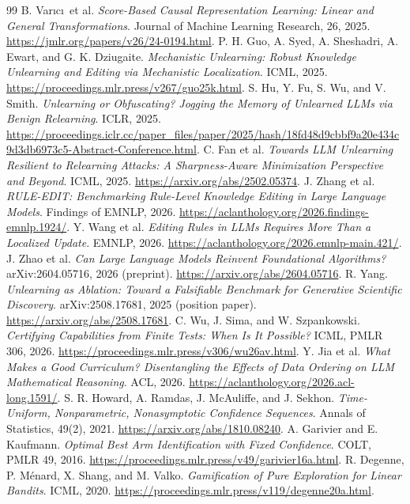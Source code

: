 \documentclass[11pt,a4paper]{article}
\theoremstyle{definition}\newtheorem{definition}[theorem]{Definition}
\theoremstyle{remark}\newtheorem{remark}[theorem]{Remark}
\begin{document}
\begin{thebibliography}{99}
 B. Var\i c\i\ et al. \emph{Score-Based Causal Representation Learning: Linear and General Transformations}. Journal of Machine Learning Research, 26, 2025. \url{https://jmlr.org/papers/v26/24-0194.html}.
 P. H. Guo, A. Syed, A. Sheshadri, A. Ewart, and G. K. Dziugaite. \emph{Mechanistic Unlearning: Robust Knowledge Unlearning and Editing via Mechanistic Localization}. ICML, 2025. \url{https://proceedings.mlr.press/v267/guo25k.html}.
 S. Hu, Y. Fu, S. Wu, and V. Smith. \emph{Unlearning or Obfuscating? Jogging the Memory of Unlearned LLMs via Benign Relearning}. ICLR, 2025. \url{https://proceedings.iclr.cc/paper_files/paper/2025/hash/18fd48d9cbbf9a20e434c9d3db6973c5-Abstract-Conference.html}.
 C. Fan et al. \emph{Towards LLM Unlearning Resilient to Relearning Attacks: A Sharpness-Aware Minimization Perspective and Beyond}. ICML, 2025. \url{https://arxiv.org/abs/2502.05374}.
 J. Zhang et al. \emph{RULE-EDIT: Benchmarking Rule-Level Knowledge Editing in Large Language Models}. Findings of EMNLP, 2026. \url{https://aclanthology.org/2026.findings-emnlp.1924/}.
 Y. Wang et al. \emph{Editing Rules in LLMs Requires More Than a Localized Update}. EMNLP, 2026. \url{https://aclanthology.org/2026.emnlp-main.421/}.
 J. Zhao et al. \emph{Can Large Language Models Reinvent Foundational Algorithms?} arXiv:2604.05716, 2026 (preprint). \url{https://arxiv.org/abs/2604.05716}.
 R. Yang. \emph{Unlearning as Ablation: Toward a Falsifiable Benchmark for Generative Scientific Discovery}. arXiv:2508.17681, 2025 (position paper). \url{https://arxiv.org/abs/2508.17681}.
 C. Wu, J. Sima, and W. Szpankowski. \emph{Certifying Capabilities from Finite Tests: When Is It Possible?} ICML, PMLR 306, 2026. \url{https://proceedings.mlr.press/v306/wu26av.html}.
 Y. Jia et al. \emph{What Makes a Good Curriculum? Disentangling the Effects of Data Ordering on LLM Mathematical Reasoning}. ACL, 2026. \url{https://aclanthology.org/2026.acl-long.1591/}.
 S. R. Howard, A. Ramdas, J. McAuliffe, and J. Sekhon. \emph{Time-Uniform, Nonparametric, Nonasymptotic Confidence Sequences}. Annals of Statistics, 49(2), 2021. \url{https://arxiv.org/abs/1810.08240}.
 A. Garivier and E. Kaufmann. \emph{Optimal Best Arm Identification with Fixed Confidence}. COLT, PMLR 49, 2016. \url{https://proceedings.mlr.press/v49/garivier16a.html}.
 R. Degenne, P. M\'enard, X. Shang, and M. Valko. \emph{Gamification of Pure Exploration for Linear Bandits}. ICML, 2020. \url{https://proceedings.mlr.press/v119/degenne20a.html}.

\end{thebibliography}
\end{document}
